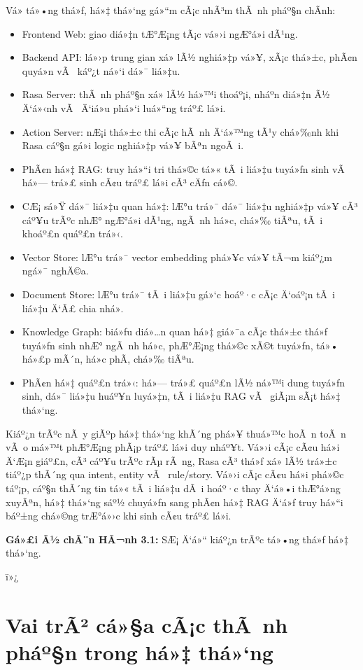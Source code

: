 ﻿\documentclass[12pt,a4paper]{report}
\begin{document}
Vá» tá»•ng thá»ƒ, há»‡ thá»‘ng gá»“m cÃ¡c nhÃ³m thÃ nh pháº§n chÃ­nh:
\begin{itemize}
    \item Frontend Web: giao diá»‡n tÆ°Æ¡ng tÃ¡c vá»›i ngÆ°á»i dÃ¹ng.
    \item Backend API: lá»›p trung gian xá»­ lÃ½ nghiá»‡p vá»¥, xÃ¡c thá»±c, phÃ¢n quyá»n vÃ  káº¿t ná»‘i dá»¯ liá»‡u.
    \item Rasa Server: thÃ nh pháº§n xá»­ lÃ½ há»™i thoáº¡i, nháº­n diá»‡n Ã½ Ä‘á»‹nh vÃ  Ä‘iá»u phá»‘i luá»“ng tráº£ lá»i.
    \item Action Server: nÆ¡i thá»±c thi cÃ¡c hÃ nh Ä‘á»™ng tÃ¹y chá»‰nh khi Rasa cáº§n gá»i logic nghiá»‡p vá»¥ bÃªn ngoÃ i.
    \item PhÃ¢n há»‡ RAG: truy há»“i tri thá»©c tá»« tÃ i liá»‡u tuyá»ƒn sinh vÃ  há»— trá»£ sinh cÃ¢u tráº£ lá»i cÃ³ cÄƒn cá»©.
    \item CÆ¡ sá»Ÿ dá»¯ liá»‡u quan há»‡: lÆ°u trá»¯ dá»¯ liá»‡u nghiá»‡p vá»¥ cÃ³ cáº¥u trÃºc nhÆ° ngÆ°á»i dÃ¹ng, ngÃ nh há»c, chá»‰ tiÃªu, tÃ i khoáº£n quáº£n trá»‹.
    \item Vector Store: lÆ°u trá»¯ vector embedding phá»¥c vá»¥ tÃ¬m kiáº¿m ngá»¯ nghÄ©a.
    \item Document Store: lÆ°u trá»¯ tÃ i liá»‡u gá»‘c hoáº·c cÃ¡c Ä‘oáº¡n tÃ i liá»‡u Ä‘Ã£ chia nhá».
    \item Knowledge Graph: biá»ƒu diá»…n quan há»‡ giá»¯a cÃ¡c thá»±c thá»ƒ tuyá»ƒn sinh nhÆ° ngÃ nh há»c, phÆ°Æ¡ng thá»©c xÃ©t tuyá»ƒn, tá»• há»£p mÃ´n, há»c phÃ­, chá»‰ tiÃªu.
    \item PhÃ¢n há»‡ quáº£n trá»‹: há»— trá»£ quáº£n lÃ½ ná»™i dung tuyá»ƒn sinh, dá»¯ liá»‡u huáº¥n luyá»‡n, tÃ i liá»‡u RAG vÃ  giÃ¡m sÃ¡t há»‡ thá»‘ng.
\end{itemize}

Kiáº¿n trÃºc nÃ y giÃºp há»‡ thá»‘ng khÃ´ng phá»¥ thuá»™c hoÃ n toÃ n vÃ o má»™t phÆ°Æ¡ng phÃ¡p tráº£ lá»i duy nháº¥t. Vá»›i cÃ¡c cÃ¢u há»i Ä‘Æ¡n giáº£n, cÃ³ cáº¥u trÃºc rÃµ rÃ ng, Rasa cÃ³ thá»ƒ xá»­ lÃ½ trá»±c tiáº¿p thÃ´ng qua intent, entity vÃ  rule/story. Vá»›i cÃ¡c cÃ¢u há»i phá»©c táº¡p, cáº§n thÃ´ng tin tá»« tÃ i liá»‡u dÃ i hoáº·c thay Ä‘á»•i thÆ°á»ng xuyÃªn, há»‡ thá»‘ng sáº½ chuyá»ƒn sang phÃ¢n há»‡ RAG Ä‘á»ƒ truy há»“i báº±ng chá»©ng trÆ°á»›c khi sinh cÃ¢u tráº£ lá»i.

\textbf{Gá»£i Ã½ chÃ¨n HÃ¬nh 3.1:} SÆ¡ Ä‘á»“ kiáº¿n trÃºc tá»•ng thá»ƒ há»‡ thá»‘ng.



ï»¿\section{Vai trÃ² cá»§a cÃ¡c thÃ nh pháº§n trong há»‡ thá»‘ng}
\end{document}
